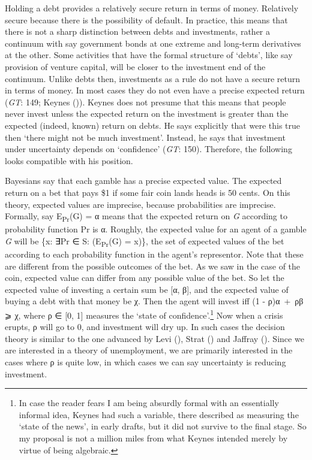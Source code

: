\documentclass[
  11pt,
  letterpaper,
  DIV=11,
  numbers=noendperiod,
  twoside]{scrartcl}
\begin{document}
Holding a debt provides a relatively secure return in terms of money.
Relatively secure because there is the possibility of default. In
practice, this means that there is not a sharp distinction between debts
and investments, rather a continuum with say government bonds at one
extreme and long-term derivatives at the other. Some activities that
have the formal structure of `debts', like say provision of venture
capital, will be closer to the investment end of the continuum. Unlike
debts then, investments as a rule do not have a secure return in terms
of money. In most cases they do not even have a precise expected return
(\emph{GT}: 149; Keynes ()). Keynes
does not presume that this means that people never invest unless the
expected return on the investment is greater than the expected (indeed,
known) return on debts. He says explicitly that were this true then
`there might not be much investment'. Instead, he says that investment
under uncertainty depends on `confidence' (\emph{GT}: 150). Therefore,
the following looks compatible with his position.

Bayesians say that each gamble has a precise expected value. The
expected return on a bet that pays \$1 if some fair coin lands heads is
50 cents. On this theory, expected values are imprecise, because
probabilities are imprecise. Formally, say E\textsubscript{Pr}(G) = α
means that the expected return on \emph{G} according to probability
function Pr is α. Roughly, the expected value for an agent of a gamble
\emph{G} will be \{x: ∃Pr ∈ S: (E\textsubscript{Pr}(G) = x)\}, the set
of expected values of the bet according to each probability function in
the agent's representor. Note that these are different from the possible
outcomes of the bet. As we saw in the case of the coin, expected value
can differ from any possible value of the bet. So let the expected value
of investing a certain sum be {[}α, β{]}, and the expected value of
buying a debt with that money be χ. Then the agent will invest iff (1 -
ρ)α~+~ρβ ⩾ χ, where ρ ∈ {[}0, 1{]} measures the `state of
confidence'.\footnote{In case the reader fears I am being absurdly
  formal with an essentially informal idea, Keynes had such a variable,
  there described as measuring the `state of the news', in early drafts,
  but it did not survive to the final stage. So my proposal is not a
  million miles from what Keynes intended merely by virtue of being
  algebraic.} Now when a crisis erupts, ρ will go to 0, and investment
will dry up. In such cases the decision theory is similar to the one
advanced by Levi (), Strat
() and Jaffray
(). Since we are interested in a theory
of unemployment, we are primarily interested in the cases where ρ is
quite low, in which cases we can say uncertainty is reducing investment.
\end{document}
